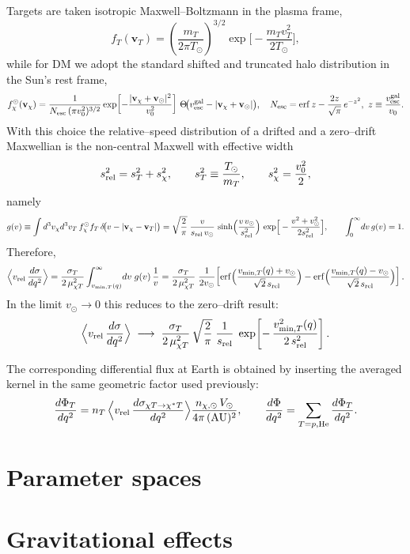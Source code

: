 \documentclass[13.1pt, letterpaper, twoside]{article}
\begin{document}
Targets are taken isotropic Maxwell–Boltzmann in the plasma frame,
\[
f_T(\mathbf v_T)=\left(\frac{m_T}{2\pi T_\odot}\right)^{\!3/2}\!
\exp\!\Big[-\frac{m_T v_T^2}{2T_\odot}\Big],
\]
while for DM we adopt the standard shifted and truncated halo distribution in the Sun’s rest frame,
\[
f_\chi^\odot(\mathbf v_\chi)=
\frac{1}{N_{\rm esc}\,(\pi v_0^2)^{3/2}}
\exp\!\left[-\frac{|\mathbf v_\chi+\mathbf v_\odot|^2}{v_0^2}\right]\,
\Theta\!\big(v_{\rm esc}^{\rm gal}-|\mathbf v_\chi+\mathbf v_\odot|\big),
\quad
N_{\rm esc}=\erf z-\frac{2z}{\sqrt{\pi}}\,e^{-z^2},\ z\equiv \frac{v_{\rm esc}^{\rm gal}}{v_0}.
\]
With this choice the relative–speed distribution of a drifted and a zero–drift Maxwellian is the non-central Maxwell with effective width
\[
s_{\rm rel}^2=s_T^2+s_\chi^2,\qquad 
s_T^2\equiv \frac{T_\odot}{m_T},\qquad
s_\chi^2=\frac{v_0^2}{2},
\]
namely
\[
g(v)\equiv\int d^3v_\chi d^3v_T\,f_\chi^\odot f_T\,\delta\!\big(v-|\mathbf v_\chi-\mathbf v_T|\big)
=\sqrt{\frac{2}{\pi}}\;\frac{v}{s_{\rm rel}\,v_\odot}\,
\sinh\!\Big(\frac{v\,v_\odot}{s_{\rm rel}^2}\Big)\,
\exp\!\Big[-\frac{v^2+v_\odot^2}{2s_{\rm rel}^2}\Big],\qquad 
\int_0^\infty\!dv\,g(v)=1.
\]
Therefore,
\[
\Big\langle v_{\rm rel}\,\frac{d\sigma}{dq^{2}}\Big\rangle
=\frac{\sigma_T}{2\,\mu_{\chi T}^2}\int_{v_{\min,T}(q)}^\infty\!dv\;g(v)\,\frac{1}{v}
=\frac{\sigma_T}{2\,\mu_{\chi T}^2}\;\frac{1}{2v_\odot}\!
\left[
\erf\!\Big(\frac{v_{\min,T}(q)+v_\odot}{\sqrt{2}\,s_{\rm rel}}\Big)
-\erf\!\Big(\frac{v_{\min,T}(q)-v_\odot}{\sqrt{2}\,s_{\rm rel}}\Big)
\right].
\]
In the limit $v_\odot\to 0$ this reduces to the zero–drift result:
\[
\Big\langle v_{\rm rel}\,\frac{d\sigma}{dq^{2}}\Big\rangle
\;\longrightarrow\;
\frac{\sigma_T}{2\,\mu_{\chi T}^2}\,
\sqrt{\frac{2}{\pi}}\;\frac{1}{s_{\rm rel}}\;
\exp\!\left[-\,\frac{v_{\min,T}^2(q)}{2\,s_{\rm rel}^2}\right].
\]

The corresponding differential flux at Earth is obtained by inserting the averaged kernel in the same geometric factor used previously:
\[
\frac{d\Phi_T}{dq^{2}}
= n_T\,
\Big\langle v_{\rm rel}\,\frac{d\sigma_{\chi T\to\chi^\ast T}}{dq^{2}}\Big\rangle
\frac{n_{\chi,\odot}\,V_\odot}{4\pi\,(\mathrm{AU})^2},
\qquad
\frac{d\Phi}{dq^{2}}=\sum_{T=p,\mathrm{He}}\frac{d\Phi_T}{dq^{2}}.
\]

\section{Parameter spaces}

\section{Gravitational effects}
\end{document}

